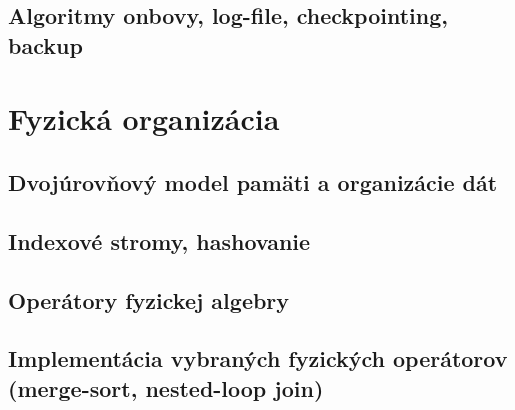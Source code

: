 \documentclass[10pt,a4paper]{article}
\begin{document}
\subsection{Algoritmy onbovy, log-file, checkpointing, backup}
    
\section{Fyzická organizácia}

\subsection{Dvojúrovňový model pamäti a organizácie dát}

\subsection{Indexové stromy, hashovanie}

\subsection{Operátory fyzickej algebry}

\subsection{Implementácia vybraných fyzických operátorov (merge-sort, nested-loop join)}


\end{document}
